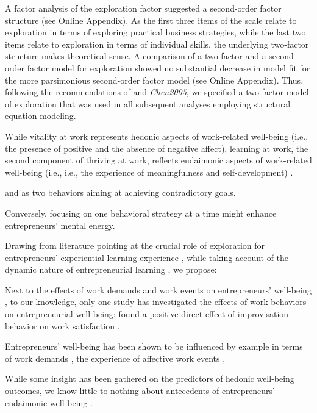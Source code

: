 \documentclass[man]{apa7}
\begin{document}
A factor analysis of the exploration factor suggested a second-order factor structure (see Online Appendix).
As the first three items of the scale relate to exploration in terms of exploring practical business strategies, while the last two items relate to exploration in terms of individual skills, the underlying two-factor structure makes theoretical sense.
A comparison of a two-factor and a second-order factor model for exploration showed no substantial decrease in model fit for the more parsimonious second-order factor model (see Online Appendix). 
Thus, following the recommendations of \textcite{Gerbing1984} and \textit{Chen2005}, we specified a two-factor model of exploration that was used in all subsequent analyses employing structural equation modeling.

While vitality at work represents hedonic aspects of work-related well-being (i.e., the presence of positive and the absence of negative aﬀect), learning at work, the second component of thriving at work, reflects eudaimonic aspects of work-related well-being (i.e., i.e., the experience of meaningfulness and self-development) \parencite[e.g.,][]{Ryan2001, Spreitzer.2005b}. 

and as two behaviors aiming at achieving contradictory goals. 

Conversely, focusing on one behavioral strategy at a time might enhance entrepreneurs' mental energy. 

Drawing from literature pointing at the crucial role of exploration for entrepreneurs' experiential learning experience \parencite[e.g.,][]{Minniti.2001, Holcomb2009}, while taking account of the dynamic nature of entrepreneurial learning \parencite{Cope.2000}, we propose:

Next to the effects of work demands and work events on entrepreneurs' well-being \parencite[e.g.,][]{Uy.2017, Perry.2008, Lechat2017}, to our knowledge, only one study has investigated the effects of work behaviors on entrepreneurial well-being: \textcite{Uy.2017} found a positive direct effect of improvisation behavior on work satisfaction \parencite{Uy.2017}. 

Entrepreneurs' well-being has been shown to be influenced by example in terms of work demands \parencite{Perry.2008}, the experience of affective work events \parencite{Uy.2017}, 

While some insight has been gathered on the predictors of hedonic well-being outcomes, we know little to nothing about antecedents of entrepreneurs' eudaimonic well-being \parencite{Stephan2018}. \par
\end{document}
